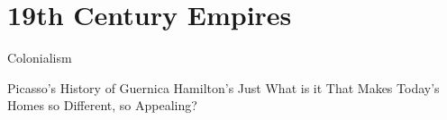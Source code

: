 


\section{19th Century Empires}
\begin{frame}{Colonialism}

\end{frame}

Picasso's History of Guernica
Hamilton's Just What is it That Makes Today's Homes so Different, so Appealing?